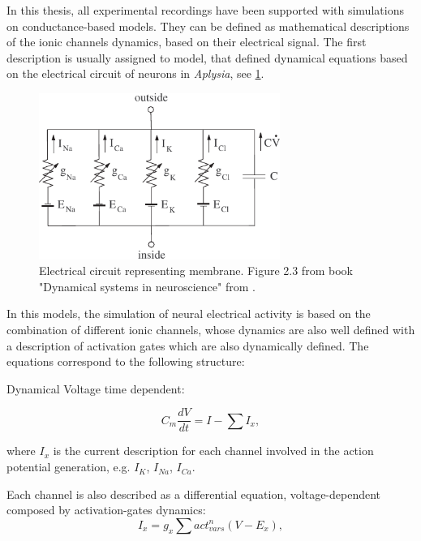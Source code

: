 In this thesis, all experimental recordings have been supported with simulations on conductance-based models. They can be defined as mathematical descriptions of the ionic channels dynamics, based on their electrical signal. The first description is usually assigned to \cite{hodgkin_quantitative_1952} model, that defined dynamical equations based on the electrical circuit of neurons in \textit{Aplysia}, see \ref{fig:electrical circuit}.

\begin{figure}[htb!]
	\centering
	\includegraphics[width=0.7\textwidth]{./img/intro/dns_neuron_circuit.pdf}
	\caption{Electrical circuit representing membrane. Figure 2.3 from book "Dynamical systems in neuroscience" from \cite{izhikevich_dynamical_2007}.}
	\label{fig:electrical circuit}
\end{figure}

In this models, the simulation of neural electrical activity is based on the combination of different ionic channels, whose dynamics are also well defined with a description of activation gates which are also dynamically defined. The equations correspond to the following structure:

Dynamical Voltage time dependent:

\begin{equation}
 C_m \frac{dV}{dt} = I - \sum I_{x},
\end{equation}

where $I_{x}$ is the current description for each channel involved in the action potential generation, e.g. $I_K$, $I_{Na}$, $I_{Ca}$.

Each channel is also described as a differential equation, voltage-dependent composed by activation-gates dynamics:
\begin{equation}
I_x =  g_x \sum act_{vars}^n (V - E_x), 
\end{equation}

